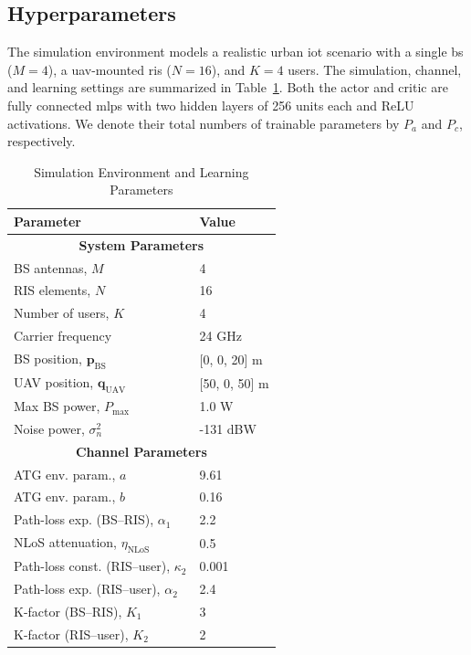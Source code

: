 \documentclass[letterpaper,journal]{IEEEtran}
\begin{document}
\subsection{Hyperparameters}
\label{sec:hyperparameters}

The simulation environment models a realistic urban \gls{iot} scenario with a single \gls{bs} ($M=4$),
a \gls{uav}-mounted \gls{ris} ($N=16$), and $K=4$ users. The simulation, channel, and learning settings
are summarized in Table~\ref{tab:sim_learn_params}. Both the actor and critic are fully connected
\glspl{mlp} with two hidden layers of 256 units each and ReLU activations. We denote their total numbers of trainable parameters by $P_a$ and $P_c$, respectively.

\begin{table}[t]
\caption{Simulation Environment and Learning Parameters}
\label{tab:sim_learn_params}
\centering
\renewcommand{\arraystretch}{1.08}
\setlength{\tabcolsep}{5pt}
\footnotesize
\begin{tabular}{|l|l|}
\hline
\textbf{Parameter} & \textbf{Value} \\
\hline
\multicolumn{2}{|c|}{\textbf{System Parameters}} \\
\hline
BS antennas, $M$ & 4 \\
RIS elements, $N$ & 16 \\
Number of users, $K$ & 4 \\
Carrier frequency & 24 GHz \\
BS position, $\mathbf{p}_{\mathrm{BS}}$ & [0, 0, 20] m \\
UAV position, $\mathbf{q}_{\mathrm{UAV}}$ & [50, 0, 50] m \\
Max BS power, $P_{\max}$ & 1.0 W \\
Noise power, $\sigma_n^2$ & -131 dBW \\
\hline
\multicolumn{2}{|c|}{\textbf{Channel Parameters}} \\
\hline
ATG env. param., $a$ & 9.61 \\
ATG env. param., $b$ & 0.16 \\
Path-loss exp. (BS--RIS), $\alpha_1$ & 2.2 \\
NLoS attenuation, $\eta_{\mathrm{NLoS}}$ & 0.5 \\
Path-loss const. (RIS--user), $\kappa_2$ & 0.001 \\
Path-loss exp. (RIS--user), $\alpha_2$ & 2.4 \\
K-factor (BS--RIS), $K_1$ & 3 \\
K-factor (RIS--user), $K_2$ & 2 \\

\end{tabular}
\end{table}
\end{document}
